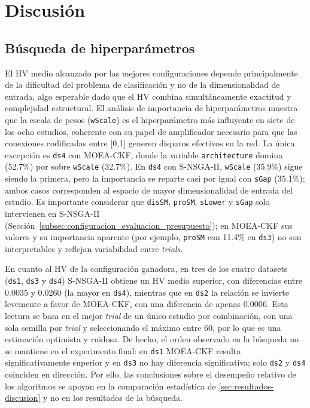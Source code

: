 \chapter{Discusión}

\section{Búsqueda de hiperparámetros}

El HV medio alcanzado por las mejores configuraciones depende principalmente de la dificultad del problema de clasificación y no de la dimensionalidad de entrada, algo esperable dado que el HV combina simultáneamente exactitud y complejidad estructural. El análisis de importancia de hiperparámetros muestra que la escala de pesos (\texttt{wScale}) es el hiperparámetro más influyente en siete de los ocho estudios, coherente con su papel de amplificador necesario para que las conexiones codificadas entre [0,1] generen disparos efectivos en la red. La única excepción es \texttt{ds4} con MOEA-CKF, donde la variable \texttt{architecture} domina (52.7\%) por sobre \texttt{wScale} (32.7\%). En \texttt{ds4} con S-NSGA-II, \texttt{wScale} (35.9\%) sigue siendo la primera, pero la importancia se reparte casi por igual con \texttt{sGap} (35.1\%); ambos casos corresponden al espacio de mayor dimensionalidad de entrada del estudio. Es importante considerar que \texttt{disSM}, \texttt{proSM}, \texttt{sLower} y \texttt{sGap} solo intervienen en S-NSGA-II (Sección~\ref{subsec:configuracion_evaluacion_presupuesto}); en MOEA-CKF sus valores y su importancia aparente (por ejemplo, \texttt{proSM} con 11.4\% en \texttt{ds3}) no son interpretables y reflejan variabilidad entre \emph{trials}.

En cuanto al HV de la configuración ganadora, en tres de los cuatro datasets (\texttt{ds1}, \texttt{ds3} y \texttt{ds4}) S-NSGA-II obtiene un HV medio superior, con diferencias entre 0.0035 y 0.0260 (la mayor en \texttt{ds4}), mientras que en \texttt{ds2} la relación se invierte levemente a favor de MOEA-CKF, con una diferencia de apenas 0.0006. Esta lectura se basa en el mejor \emph{trial} de un único estudio por combinación, con una sola semilla por \emph{trial} y seleccionando el máximo entre 60, por lo que es una estimación optimista y ruidosa. De hecho, el orden observado en la búsqueda no se mantiene en el experimento final: en \texttt{ds1} MOEA-CKF resulta significativamente superior y en \texttt{ds3} no hay diferencia significativa; solo \texttt{ds2} y \texttt{ds4} coinciden en dirección. Por ello, las conclusiones sobre el desempeño relativo de los algoritmos se apoyan en la comparación estadística de \ref{sec:resultados-discusion} y no en los resultados de la búsqueda.

